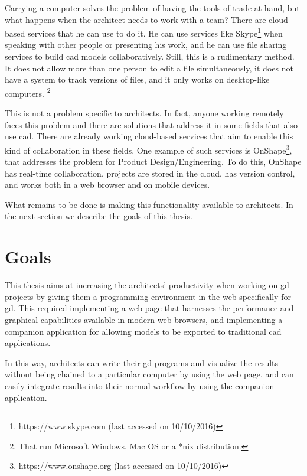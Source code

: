 Carrying a computer solves the problem of having the tools of trade at hand, but what happens when the architect needs to work with a team?
There are cloud-based services that he can use to do it.
He can use services like Skype\footnote{https://www.skype.com (last accessed on 10/10/2016)} when speaking with other people or presenting his work, and he can use file sharing services to build \gls{cad} models collaboratively.
Still, this is a rudimentary method.
It does not allow more than one person to edit a file simultaneously, it does not have a system to track versions of files, and it only works on desktop-like computers.%
\footnote{That run Microsoft Windows, Mac OS or a *nix distribution.}

This is not a problem specific to architects.
In fact, anyone working remotely faces this problem and there are solutions that address it in some fields that also use \gls{cad}.
There are already working cloud-based services that aim to enable this kind of collaboration in these fields.
One example of such services is OnShape\footnote{https://www.onshape.org (last accessed on 10/10/2016)}, that addresses the problem for Product Design/Engineering.
To do this, OnShape has real-time collaboration, projects are stored in the cloud, has version control, and works both in a web browser and on mobile devices.

What remains to be done is making this functionality available to architects.
In the next section we describe the goals of this thesis.


\section{Goals}
This thesis aims at increasing the architects' productivity when working on \gls{gd} projects by giving them a programming environment in the web specifically for \gls{gd}.
This required implementing a web page that harnesses the performance and graphical capabilities available in modern web browsers, and implementing a companion application for allowing models to be exported to traditional \gls{cad} applications.

In this way, architects can write their \gls{gd} programs and visualize the results without being chained to a particular computer by using the web page, and can easily integrate results into their normal workflow by using the companion application.


